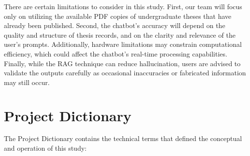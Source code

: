 \begin{refsection}
\bigbreak
\hspace{0.4cm}There are certain limitations to consider in this study. First, our team will focus only on utilizing the available PDF copies of undergraduate theses that have already been published. Second, the chatbot’s accuracy will depend on the quality and structure of thesis records, and on the clarity and relevance of the user's prompts. Additionally, hardware limitations may constrain computational efficiency, which could affect the chatbot’s real-time processing capabilities. Finally, while the RAG technique can reduce hallucination, users are advised to validate the outputs carefully as occasional inaccuracies or fabricated information may still occur. 


\section{Project Dictionary}

The Project Dictionary contains the technical terms that defined the conceptual and operation of this study:


\end{refsection}
